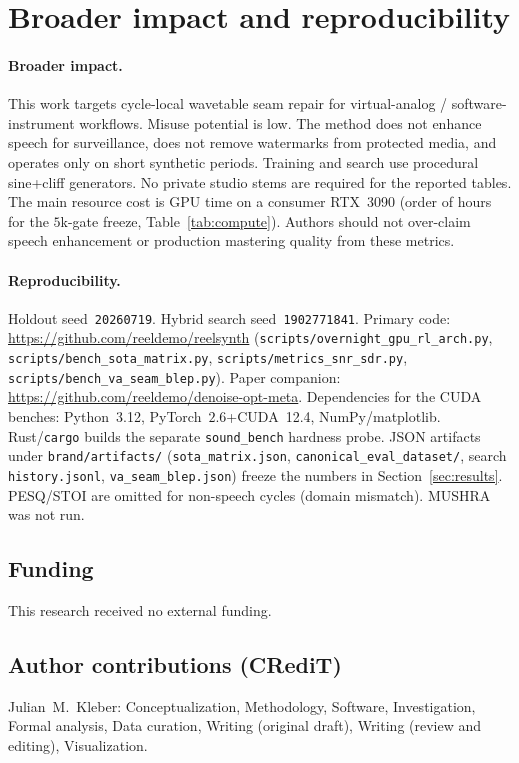 \section{Broader impact and reproducibility}
\label{sec:ethics}

\paragraph{Broader impact.}
This work targets cycle-local wavetable seam repair for virtual-analog / software-instrument workflows.
Misuse potential is low.
The method does not enhance speech for surveillance, does not remove watermarks from protected media, and operates only on short synthetic periods.
Training and search use procedural sine{+}cliff generators. No private studio stems are required for the reported tables.
The main resource cost is GPU time on a consumer RTX~3090 (order of hours for the $5$k-gate freeze, Table~\ref{tab:compute}).
Authors should not over-claim speech enhancement or production mastering quality from these metrics.

\paragraph{Reproducibility.}
Holdout seed~\texttt{20260719}. Hybrid search seed~\texttt{1902771841}.
Primary code: \url{https://github.com/reeldemo/reelsynth} (\texttt{scripts/overnight\_gpu\_rl\_arch.py}, \texttt{scripts/bench\_sota\_matrix.py}, \texttt{scripts/metrics\_snr\_sdr.py}, \texttt{scripts/bench\_va\_seam\_blep.py}).
Paper companion: \url{https://github.com/reeldemo/denoise-opt-meta}.
Dependencies for the CUDA benches: Python~3.12, PyTorch~$2.6$+CUDA~12.4, NumPy/matplotlib. Rust/\texttt{cargo} builds the separate \texttt{sound\_bench} hardness probe.
JSON artifacts under \texttt{brand/artifacts/} (\texttt{sota\_matrix.json}, \texttt{canonical\_eval\_dataset/}, search \texttt{history.jsonl}, \texttt{va\_seam\_blep.json}) freeze the numbers in Section~\ref{sec:results}.
PESQ/STOI are omitted for non-speech cycles (domain mismatch). MUSHRA was not run.

\subsection{Funding}
\label{sec:funding}
This research received no external funding.

\subsection{Author contributions (CRediT)}
\label{sec:credit}
Julian~M.~Kleber: Conceptualization, Methodology, Software, Investigation, Formal analysis, Data curation, Writing (original draft), Writing (review and editing), Visualization.

